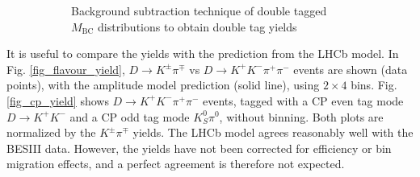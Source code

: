 \documentclass[12pt, a4paper, notitlepage, onecolumn]{article}
\numberwithin{equation}{section}
\begin{document}
\begin{figure}[H]
\begin{subfigure}{0.5\textwidth}
  \caption{Background subtraction technique of double tagged $M_\text{BC}$ distributions to obtain double tag yields}
    \label{fig_dtyield}
  \end{subfigure}
  \caption{}
\end{figure}

It is useful to compare the yields with the prediction from the LHCb model. In Fig. \ref{fig_flavour_yield}, $D\to K^\pm\pi^\mp$ vs $D\to K^+K^-\pi^+\pi^-$ events are shown (data points), with the amplitude model prediction (solid line), using $2\times 4$ bins. Fig. \ref{fig_cp_yield} shows $D\to K^+K^-\pi^+\pi^-$ events, tagged with a CP even tag mode $D\to K^+K^-$ and a CP odd tag mode $K_S^0\pi^0$, without binning. Both plots are normalized by the $K^\pm\pi^\mp$ yields. The LHCb model agrees reasonably well with the BESIII data. However, the yields have not been corrected for efficiency or bin migration effects, and a perfect agreement is therefore not expected.
\end{document}
